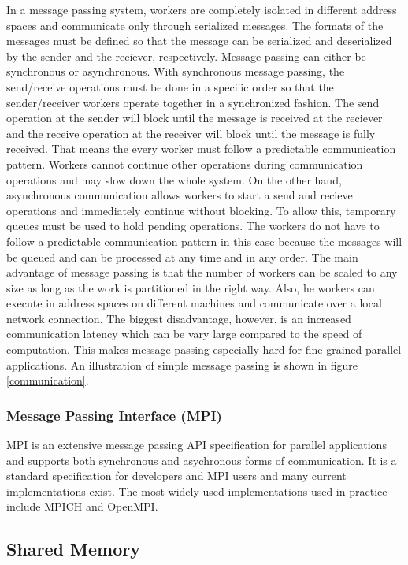 \documentclass[11pt]{book}
\begin{document}
In a message passing system, workers are completely isolated in different address spaces
and communicate only through serialized messages. The formats of the messages must be
defined so that the message can be serialized and deserialized by the sender and the reciever,
respectively. Message passing can either be synchronous or asynchronous. With synchronous
message passing, the send/receive operations must be done in a specific order so that the
sender/receiver workers operate together in a synchronized fashion. The send operation at
the sender will block until the message is received at the reciever and the receive operation
at the receiver will block until the message is fully received. That means the every worker
must follow a predictable communication pattern. Workers cannot continue other operations
during communication operations and may slow down the whole system. On the other hand,
asynchronous communication allows workers to start a send and recieve operations and immediately
continue without blocking. To allow this, temporary queues must be used to hold pending
operations. The workers do not have to follow a predictable communication pattern in this
case because the messages will be queued and can be processed at any time and in any order.
The main advantage of message passing is that the number of workers can be scaled to any size
as long as the work is partitioned in the right way. Also, he workers can execute in address
spaces on different machines and communicate over a local network connection. The biggest
disadvantage, however, is an increased communication latency which can be vary large compared
to the speed of computation. This makes message passing especially hard for fine-grained
parallel applications. An illustration of simple message passing is shown in figure
\ref{communication}.

\subsubsection{Message Passing Interface (MPI)}

MPI\cite{Forum:1994:MMI:898758} is an extensive message passing API specification for parallel
applications and supports both synchronous and asychronous forms of communication. It is
a standard specification for developers and MPI users and many current implementations exist.
The most widely used implementations used in practice include MPICH and OpenMPI.

\subsection{Shared Memory}
\end{document}
